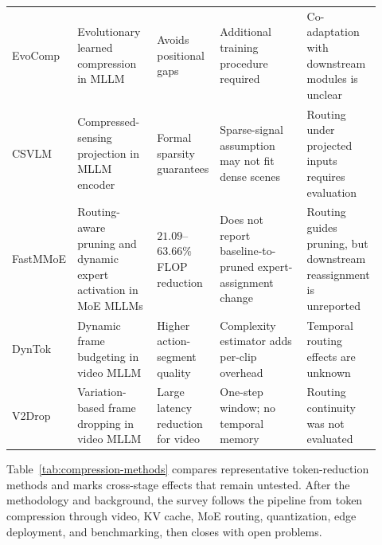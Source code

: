 \documentclass[10pt]{article}
\newenvironment{reviewchange}{\begingroup\color{red}}{\endgroup}
\begin{document}
\begin{table}[!htbp]
\begin{tabular}{p{0.15\linewidth} p{0.22\linewidth} p{0.13\linewidth} p{0.25\linewidth} p{0.17\linewidth}}
EvoComp \citep{song2026evocomplearningvisualtoken} & Evolutionary learned compression in MLLM & Avoids positional gaps & Additional training procedure required & Co-adaptation with downstream modules is unclear \\
CSVLM \citep{kiruluta2025csvlmcompressedsensingattention} & Compressed-sensing projection in MLLM encoder & Formal sparsity guarantees & Sparse-signal assumption may not fit dense scenes & Routing under projected inputs requires evaluation \\
FastMMoE \citep{xia2025fastmmoe} & Routing-aware pruning and dynamic expert activation in MoE MLLMs & $21.09$--$63.66\%$ FLOP reduction & Does not report baseline-to-pruned expert-assignment change & Routing guides pruning, but downstream reassignment is unreported \\
DynTok \citep{zhang2025dyntokdynamiccompressionvisual} & Dynamic frame budgeting in video MLLM & Higher action-segment quality & Complexity estimator adds per-clip overhead & Temporal routing effects are unknown \\
V2Drop \citep{chen2026variationawarevisiontokendropping} & Variation-based frame dropping in video MLLM & Large latency reduction for video & One-step window; no temporal memory & Routing continuity was not evaluated \\
\bottomrule
\end{tabular}
\end{table}
Table~\ref{tab:compression-methods} compares representative token-reduction methods and
marks cross-stage effects that remain untested.
\begin{reviewchange}
After the methodology and background, the survey follows the pipeline from token
compression through video, KV cache, MoE routing, quantization, edge deployment, and
benchmarking, then closes with open problems.
\end{reviewchange}
\end{document}
